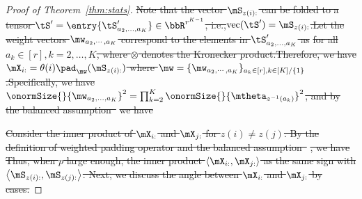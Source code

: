 \documentclass[lettersize,onecolumn,journal]{IEEEtran}
\theoremstyle{definition}
\theoremstyle{definition}
\newcommand{\ang}[1]{\left\langle#1\right\rangle}
\providecommand{\DIFdeltex}[1]{{\protect\color{red}\sout{#1}}}                      %
\providecommand{\DIFdel}[1]{\texorpdfstring{\DIFdeltex{#1}}{}} %
\begin{document}
\begin{proof}[Proof of Theorem~\ref{thm:stats}]
\DIFdel{Note that the vector $\mS_{z(i):}$ can be folded to a tensor $\tS' =\entry{\tS'_{a_2,\ldots,a_K}} \in \bbR^{r^{K-1}}$, i.e.,$\text{vec}(\tS') = \mS_{z(i):}$.Let the weight vectors $\mw_{a_2, \cdots, a_K}$ correspond to the elements in $\tS'_{a_2,\ldots,a_K}$ as
}%
\DIFdel{for all $a_k \in [r], k = 2,\ldots, K$, where $\otimes$ denotes the Kronecker product.Therefore, we have  $\mX_{i:} = \theta(i) \pad_{\mw}(\mS_{z(i):})$ where $\mw = \{ \mw_{a_2, \cdots, a_K}\}_{a_k \in [r], k\in [K]/\{1\}}$.Specifically, we have $\onormSize{}{\mw_{a_2, \ldots, a_K}}^2 = \prod_{k = 2}^K \onormSize{}{ \mtheta_{z^{-1}(a_k)}}^2$, and by the balanced assumption~}%
\DIFdel{we have 
}%

\DIFdel{Consider the inner product of $\mX_{i:}$ and $\mX_{j:}$ for $z(i) \neq z(j)$. By the definition of weighted padding operator and the balanced assumption~}%
\DIFdel{, we have 
}%
\DIFdel{Thus, when $p$ large enough, the inner product $\ang{\mX_{i:},\mX_{j:}} $ as the same sign with $\ang{\mS_{z(i):}, \mS_{z(j):}}$. Next, we discuss the angle between $\mX_{i:}$ and $\mX_{j:}$ by cases.
}%


\end{proof}
\end{document}
